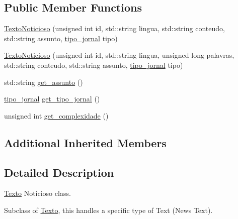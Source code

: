 \subsection*{Public Member Functions}
\begin{DoxyCompactItemize}
\item 
\hyperlink{class_texto_noticioso_a74a984b14609c5ad38a32cefcc5c9da7}{Texto\-Noticioso} (unsigned int id, std\-::string lingua, std\-::string conteudo, std\-::string assunto, \hyperlink{_texto_noticioso_8h_adbee2daefeb8a5b2ec0e0c0b353390d5}{tipo\-\_\-jornal} tipo)
\item 
\hyperlink{class_texto_noticioso_a9b82b7cd28537c9aa6c214d3439ab6f5}{Texto\-Noticioso} (unsigned int id, std\-::string lingua, unsigned long palavras, std\-::string conteudo, std\-::string assunto, \hyperlink{_texto_noticioso_8h_adbee2daefeb8a5b2ec0e0c0b353390d5}{tipo\-\_\-jornal} tipo)
\item 
std\-::string \hyperlink{class_texto_noticioso_afd686397a10b9e6afa8eb9f1aaf5d21e}{get\-\_\-assunto} ()
\item 
\hyperlink{_texto_noticioso_8h_adbee2daefeb8a5b2ec0e0c0b353390d5}{tipo\-\_\-jornal} \hyperlink{class_texto_noticioso_ac0edd9121ef61cb4adc360faabecd62b}{get\-\_\-tipo\-\_\-jornal} ()
\item 
unsigned int \hyperlink{class_texto_noticioso_a5179276c932815f134aa1e70a6840d64}{get\-\_\-complexidade} ()
\end{DoxyCompactItemize}
\subsection*{Additional Inherited Members}


\subsection{Detailed Description}
\hyperlink{class_texto}{Texto} Noticioso class. 

Subclass of \hyperlink{class_texto}{Texto}, this handles a specific type of Text (News Text). 

